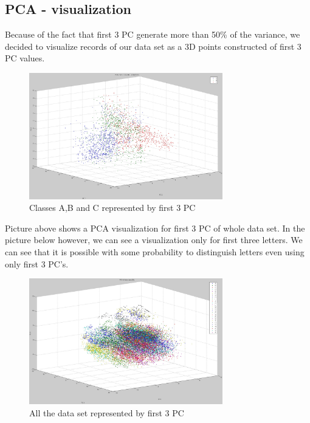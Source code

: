 \subsection*{PCA - visualization}
Because of the fact that first 3 PC generate more than 50\% of the variance, we
decided to visualize records of our data set as a 3D points constructed of first
3 PC values. 
\begin{figure}[!tbh]
	\centering
	\includegraphics[width=0.75\textwidth]{figures/pca_points_abc_3D}
	\caption{Classes A,B and C represented by first 3 PC}
	\label{fig:pca_points_abc_3D}
\end{figure} 
Picture above shows a PCA visualization for first 3 PC of whole data set. 
In the picture below however, we can see a visualization only for first
three letters. We can see that it is possible with some probability 
to distinguish letters even using only first 3 PC's.
\begin{figure}[!tbh]
	\centering
	\includegraphics[width=0.75\textwidth]{figures/pca_points_all_3D}
	\caption{All the data set represented by first 3 PC}
	\label{fig:pca_points_all_3D}
\end{figure}